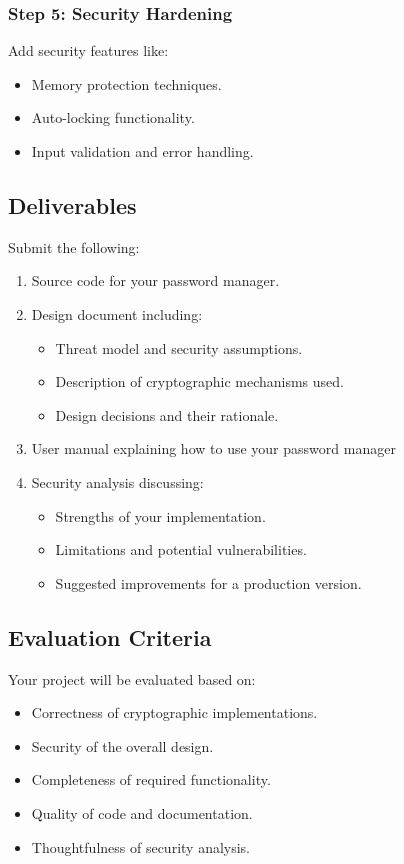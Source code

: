 \documentclass[10pt,a4paper,american]{exam}
\begin{document}
\subsubsection*{Step 5: Security Hardening}
Add security features like:
\begin{itemize}
	\item Memory protection techniques.
	\item Auto-locking functionality.
	\item Input validation and error handling.
\end{itemize}

\subsection*{Deliverables}
Submit the following:

\begin{enumerate}
	\item Source code for your password manager.
	\item Design document including:
	      \begin{itemize}
		      \item Threat model and security assumptions.
		      \item Description of cryptographic mechanisms used.
		      \item Design decisions and their rationale.
	      \end{itemize}
	\item User manual explaining how to use your password manager
	\item Security analysis discussing:
	      \begin{itemize}
		      \item Strengths of your implementation.
		      \item Limitations and potential vulnerabilities.
		      \item Suggested improvements for a production version.
	      \end{itemize}
\end{enumerate}

\subsection*{Evaluation Criteria}
Your project will be evaluated based on:

\begin{itemize}
	\item Correctness of cryptographic implementations.
	\item Security of the overall design.
	\item Completeness of required functionality.
	\item Quality of code and documentation.
	\item Thoughtfulness of security analysis.
\end{itemize}
\end{document}
